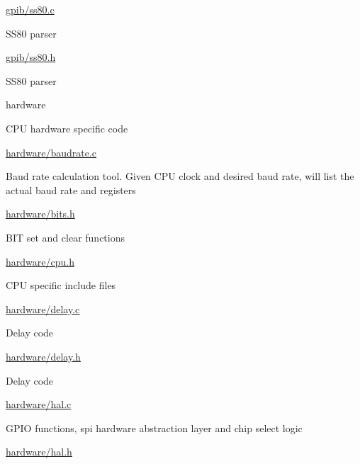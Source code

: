 \begin{DoxyItemize}
\begin{DoxyItemize}
\begin{DoxyItemize}
\end{DoxyItemize}
\item \hyperlink{ss80_8c}{gpib/ss80.\+c}
\begin{DoxyItemize}
\item S\+S80 parser
\end{DoxyItemize}
\item \hyperlink{ss80_8h}{gpib/ss80.\+h}
\begin{DoxyItemize}
\item S\+S80 parser
\end{DoxyItemize}
\end{DoxyItemize}
\item hardware
\begin{DoxyItemize}
\item C\+PU hardware specific code
\item \hyperlink{baudrate_8c}{hardware/baudrate.\+c}
\begin{DoxyItemize}
\item Baud rate calculation tool. Given C\+PU clock and desired baud rate, will list the actual baud rate and registers
\end{DoxyItemize}
\item \hyperlink{bits_8h}{hardware/bits.\+h}
\begin{DoxyItemize}
\item B\+IT set and clear functions
\end{DoxyItemize}
\item \hyperlink{cpu_8h}{hardware/cpu.\+h}
\begin{DoxyItemize}
\item C\+PU specific include files
\end{DoxyItemize}
\item \hyperlink{delay_8c}{hardware/delay.\+c}
\begin{DoxyItemize}
\item Delay code
\end{DoxyItemize}
\item \hyperlink{delay_8h}{hardware/delay.\+h}
\begin{DoxyItemize}
\item Delay code
\end{DoxyItemize}
\item \hyperlink{hal_8c}{hardware/hal.\+c}
\begin{DoxyItemize}
\item G\+P\+IO functions, spi hardware abstraction layer and chip select logic
\end{DoxyItemize}
\item \hyperlink{hal_8h}{hardware/hal.\+h}

\end{DoxyItemize}
\end{DoxyItemize}
